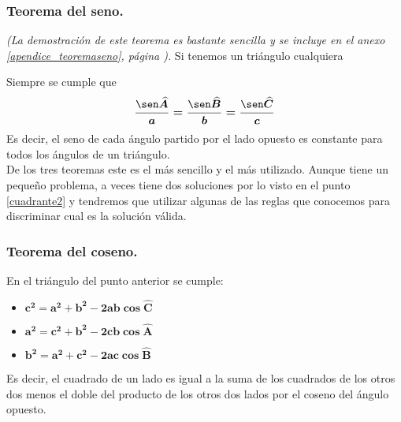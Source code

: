 \documentclass[a4paper,11pt,answers]{exam}
\begin{document}
\subsubsection{Teorema del seno.}
\emph{(La demostración de este teorema es bastante sencilla y se incluye en el anexo
  \ref{apendice_teoremaseno}, página \pageref{apendice_teoremaseno}).}
Si tenemos un triángulo cualquiera
\begin{center}
\end{center}
Siempre se cumple que
\[\boldsymbol{\frac{\sen \widehat{A}}{a} = \frac{\sen \widehat{B}}{b}
    =\frac{\sen \widehat{C}}{c}}\]
Es decir, el seno de cada ángulo partido por el lado opuesto es constante para todos los ángulos de un triángulo.\\

De los tres teoremas este es el más sencillo y el más utilizado. Aunque tiene un pequeño problema,
a veces tiene dos soluciones por lo visto en el punto \ref{cuadrante2} y tendremos que utilizar algunas de las reglas que conocemos para discriminar cual es la solución válida.

\subsubsection{Teorema del coseno.}
En el triángulo del punto anterior se cumple:
\begin{itemize}
\item $\boldsymbol{c^2= a^2 + b^2 - 2ab\cos \widehat{C}}$
\item $\boldsymbol{a^2= c^2 + b^2 - 2cb\cos \widehat{A}}$
\item $\boldsymbol{b^2= a^2 + c^2 - 2ac\cos \widehat{B}}$
\end{itemize}
Es decir, el cuadrado de un lado es igual a la suma de los cuadrados de los otros dos menos el doble del producto de los otros dos lados por el coseno del ángulo opuesto.\\
\end{document}
